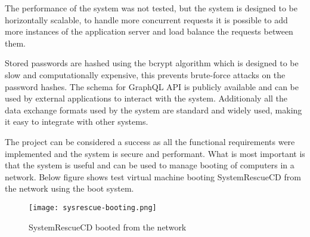 \documentclass[./main.tex]{subfiles}
\begin{document}
The performance of the system was not tested, but the system is designed to be
horizontally scalable, to handle more concurrent requests it is possible to add more
instances of the application server and load balance the requests between them.

Stored passwords are hashed using the bcrypt algorithm which is designed to
be slow and computationally expensive, this prevents brute-force attacks on the
password hashes. The schema for GraphQL API is publicly available and can be
used by external applications to interact with the system. Additionaly all the data
exchange formats used by the system are standard and widely used, making it easy
to integrate with other systems.

The project can be considered a success as all the functional requirements were
implemented and the system is secure and performant. What is most important
is that the system is useful and can be used to manage booting of computers in a
network. Below figure shows test virtual machine booting SystemRescueCD from
the network using the boot system.

\begin{figure}[H]
  \centering
  \texttt{[image: sysrescue-booting.png]}
  \caption{SystemRescueCD booted from the network}
\end{figure}
\end{document}
